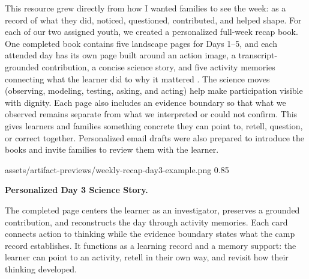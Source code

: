 
\vspace{-0.5cm}

This resource grew directly from how I wanted families to see the week: as a record of what they did, noticed, questioned, contributed, and helped shape. For each of our two assigned youth, we created a personalized full-week recap book. One completed book contains five landscape pages for Days 1--5, and each attended day has its own page built around an action image, a transcript-grounded contribution, a concise science story, and five activity memories connecting what the learner did to why it mattered \citep{campEvidence2026}. The science moves (observing, modeling, testing, asking, and acting) help make participation visible with dignity. Each page also includes an evidence boundary so that what we observed remains separate from what we interpreted or could not confirm. This gives learners and families something concrete they can point to, retell, question, or correct together. Personalized email drafts were also prepared to introduce the books and invite families to review them with the learner.

\begin{center}

\restrictedartifact
  {assets/artifact-previews/weekly-recap-day3-example.png}
  {0.85\textwidth}

\parbox{1.0\textwidth}{\centering
\textbf{\color{DeepNavy}Personalized Day 3 Science Story.}

The completed page centers the learner as an investigator, preserves a grounded contribution, and reconstructs the day through activity memories. Each card connects action to thinking while the evidence boundary states what the camp record establishes. It functions as a learning record and a memory support: the learner can point to an activity, retell in their own way, and revisit how their thinking developed.
}

\end{center}

\newpage
\small



